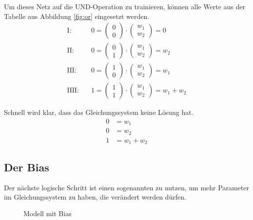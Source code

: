 Um dieses Netz auf die UND-Operation zu trainieren, können alle Werte aus der Tabelle aus Abbildung \ref{fig:or} eingesetzt werden.
\begin{align}
    \text{I:}&\quad 0=\begin{pmatrix}
        0 \\
        0
    \end{pmatrix}\cdot
    \begin{pmatrix}
        w_1 \\
        w_2
    \end{pmatrix}=0 \\
    \text{II:}&\quad 0=\begin{pmatrix}
        0 \\
        1
    \end{pmatrix}\cdot
    \begin{pmatrix}
        w_1 \\
        w_2
    \end{pmatrix}=w_2 \\
    \text{III:}&\quad 0=\begin{pmatrix}
        1 \\
        0
    \end{pmatrix}\cdot
    \begin{pmatrix}
        w_1 \\
        w_2
    \end{pmatrix}=w_1 \\
    \text{IIII:}&\quad 1=\begin{pmatrix}
        1 \\
        1
    \end{pmatrix}\cdot
    \begin{pmatrix}
        w_1 \\
        w_2
    \end{pmatrix}=w_1+w_2
\end{align}

Schnell wird klar, dass das Gleichungssystem keine Lösung hat.
\begin{align}
    0&=w_1 \\
    0&=w_2 \\
    1&=w_1+w_2
\end{align}

\subsection{Der Bias}
Der nächste logische Schritt ist einen sogenannten  zu nutzen, um mehr Parameter im Gleichungssystem zu haben, die verändert werden dürfen.
\begin{figure}[ht]
    \centering
    \caption{Modell mit Bias}
    \label{fig:net1}
\end{figure}


